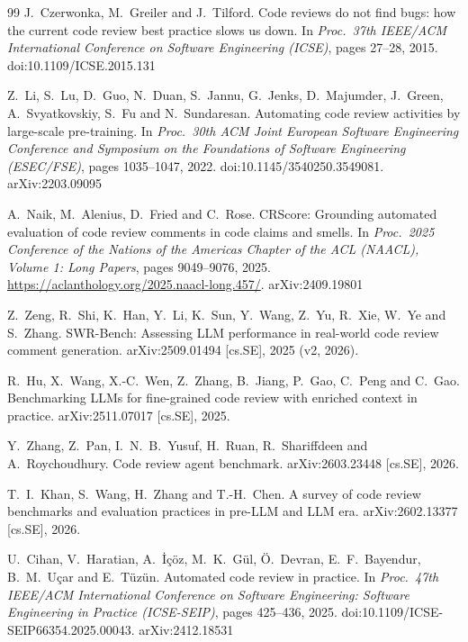 \documentclass[11pt,a4paper]{article}
\begin{document}
\begin{thebibliography}{99}
J.~Czerwonka, M.~Greiler and J.~Tilford.
\newblock Code reviews do not find bugs: how the current code review best
practice slows us down.
\newblock In \emph{Proc.\ 37th IEEE/ACM International Conference on
Software Engineering (ICSE)}, pages 27--28, 2015.
\newblock doi:10.1109/ICSE.2015.131


Z.~Li, S.~Lu, D.~Guo, N.~Duan, S.~Jannu, G.~Jenks, D.~Majumder, J.~Green,
A.~Svyatkovskiy, S.~Fu and N.~Sundaresan.
\newblock Automating code review activities by large-scale pre-training.
\newblock In \emph{Proc.\ 30th ACM Joint European Software Engineering
Conference and Symposium on the Foundations of Software Engineering
(ESEC/FSE)}, pages 1035--1047, 2022.
\newblock doi:10.1145/3540250.3549081. arXiv:2203.09095

A.~Naik, M.~Alenius, D.~Fried and C.~Rose.
\newblock CRScore: Grounding automated evaluation of code review comments
in code claims and smells.
\newblock In \emph{Proc.\ 2025 Conference of the Nations of the Americas
Chapter of the ACL (NAACL), Volume 1: Long Papers}, pages 9049--9076, 2025.
\newblock \url{https://aclanthology.org/2025.naacl-long.457/}. arXiv:2409.19801

Z.~Zeng, R.~Shi, K.~Han, Y.~Li, K.~Sun, Y.~Wang, Z.~Yu, R.~Xie, W.~Ye and
S.~Zhang.
\newblock SWR-Bench: Assessing LLM performance in real-world code review
comment generation.
\newblock arXiv:2509.01494 [cs.SE], 2025 (v2, 2026).

R.~Hu, X.~Wang, X.-C.~Wen, Z.~Zhang, B.~Jiang, P.~Gao, C.~Peng and C.~Gao.
\newblock Benchmarking LLMs for fine-grained code review with enriched
context in practice.
\newblock arXiv:2511.07017 [cs.SE], 2025.

Y.~Zhang, Z.~Pan, I.~N.~B.~Yusuf, H.~Ruan, R.~Shariffdeen and
A.~Roychoudhury.
\newblock Code review agent benchmark.
\newblock arXiv:2603.23448 [cs.SE], 2026.

T.~I.~Khan, S.~Wang, H.~Zhang and T.-H.~Chen.
\newblock A survey of code review benchmarks and evaluation practices in
pre-LLM and LLM era.
\newblock arXiv:2602.13377 [cs.SE], 2026.

U.~Cihan, V.~Haratian, A.~\.I\c{c}\"oz, M.~K.~G\"ul, \"O.~Devran,
E.~F.~Bayendur, B.~M.~U\c{c}ar and E.~T\"uz\"un.
\newblock Automated code review in practice.
\newblock In \emph{Proc.\ 47th IEEE/ACM International Conference on
Software Engineering: Software Engineering in Practice (ICSE-SEIP)},
pages 425--436, 2025.
\newblock doi:10.1109/ICSE-SEIP66354.2025.00043. arXiv:2412.18531


\end{thebibliography}
\end{document}
